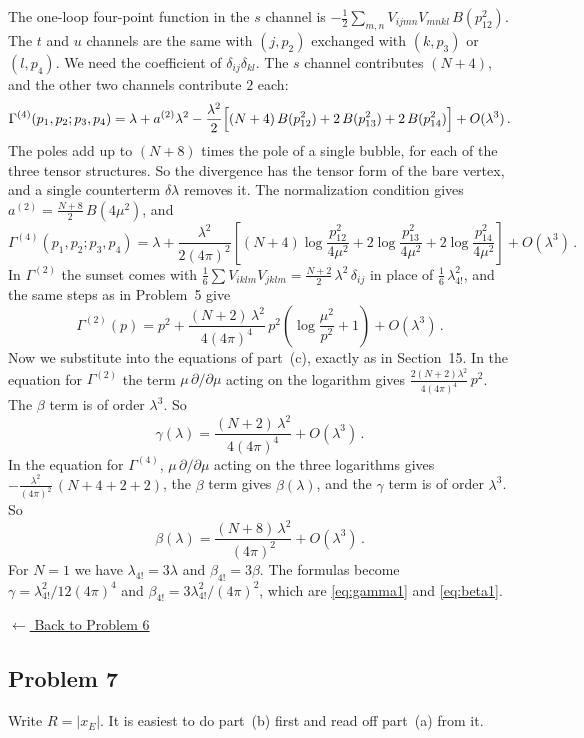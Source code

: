 The one-loop four-point function in the $s$ channel is
$-\frac12\sum_{m,n}V_{ijmn}V_{mnkl}\,B(p_{12}^2)$. The $t$ and $u$ channels are
the same with $(j,p_2)$ exchanged with $(k,p_3)$ or $(l,p_4)$. We need the
coefficient of $\delta_{ij}\delta_{kl}$. The $s$ channel contributes $(N+4)$,
and the other two channels contribute $2$ each:
\[
\Gamma^{(4)}(p_1,p_2;p_3,p_4)=\lambda+a^{(2)}\lambda^2-\frac{\lambda^2}2\Bigl[(N+4)\,B(p_{12}^2)+2\,B(p_{13}^2)+2\,B(p_{14}^2)\Bigr]+O(\lambda^3)\,.
\]
The poles add up to $(N+8)$ times the pole of a single bubble, for each of the
three tensor structures. So the divergence has the tensor form of the bare
vertex, and a single counterterm $\delta\lambda$ removes it. The normalization
condition gives $a^{(2)}=\frac{N+8}2\,B(4\mu^2)$, and
\[
\Gamma^{(4)}(p_1,p_2;p_3,p_4)=\lambda+\frac{\lambda^2}{2(4\pi)^2}\left[(N+4)\log\frac{p_{12}^2}{4\mu^2}+2\log\frac{p_{13}^2}{4\mu^2}+2\log\frac{p_{14}^2}{4\mu^2}\right]+O(\lambda^3)\,.
\]
In $\Gamma^{(2)}$ the sunset comes with $\frac16\sum V_{iklm}V_{jklm}=\frac{N+2}2\,\lambda^2\,\delta_{ij}$
in place of $\frac16\,\lambda_{4!}^2$, and the same steps as in Problem~5 give
\[
\Gamma^{(2)}(p)=p^2+\frac{(N+2)\,\lambda^2}{4(4\pi)^4}\,p^2\left(\log\frac{\mu^2}{p^2}+1\right)+O(\lambda^3)\,.
\]
Now we substitute into the equations of part~(c), exactly as in Section~15.
In the equation for $\Gamma^{(2)}$ the term $\mu\,\partial/\partial\mu$ acting on
the logarithm gives $\frac{2(N+2)\lambda^2}{4(4\pi)^4}\,p^2$. The $\beta$ term is of
order $\lambda^3$. So
\[
\gamma(\lambda)=\frac{(N+2)\,\lambda^2}{4(4\pi)^4}+O(\lambda^3)\,.
\]
In the equation for $\Gamma^{(4)}$, $\mu\,\partial/\partial\mu$ acting on the
three logarithms gives $-\frac{\lambda^2}{(4\pi)^2}\,(N+4+2+2)$, the $\beta$
term gives $\beta(\lambda)$, and the $\gamma$ term is of order $\lambda^3$. So
\[
\beta(\lambda)=\frac{(N+8)\,\lambda^2}{(4\pi)^2}+O(\lambda^3)\,.
\]
For $N=1$ we have $\lambda_{4!}=3\lambda$ and $\beta_{4!}=3\beta$. The formulas
become $\gamma=\lambda_{4!}^2/12(4\pi)^4$ and
$\beta_{4!}=3\lambda_{4!}^2/(4\pi)^2$, which are \eqref{eq:gamma1} and
\eqref{eq:beta1}.

\noindent\hyperref[hw:6]{$\leftarrow$ Back to Problem 6}

\subsection{Problem 7}\label{sol:7}

Write $R=|x_E|$. It is easiest to do part~(b) first and read off part~(a) from it.

